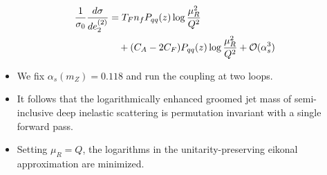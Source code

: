 \begin{align}
  \frac{1}{\sigma_0} \frac{d\sigma}{de_2^{(2)}} &= T_F n_f P_{qq}(z) \log\frac{\mu_R^2}{Q^2} \nonumber \\
  &\quad + (C_A - 2C_F) P_{qq}(z) \log\frac{\mu_R^2}{Q^2} + \mathcal{O}(\alpha_s^3) \label{eq:4}
\end{align}

\begin{itemize}
  \item We fix $\alpha_s(m_Z) = 0.118$ and run the coupling at two loops.
  \item It follows that the logarithmically enhanced groomed jet mass of semi-inclusive deep inelastic scattering is permutation invariant with a single forward pass.
  \item Setting $\mu_R = Q$, the logarithms in the unitarity-preserving eikonal approximation are minimized.
\end{itemize}

